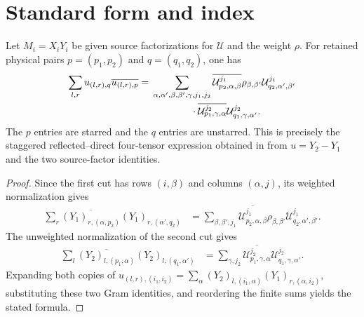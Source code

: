 \section{Standard form and index}

\begin{lemma}
    \label{thm:mpu_source_u_staggered_gram}
    \leanok
    Let $M_i=X_iY_i$ be given source factorizations for $\mathcal U$ and
    the weight $\rho$. For retained physical pairs $p=(p_1,p_2)$ and
    $q=(q_1,q_2)$, one has
    \begin{align}
        \sum_{l,r}u_{(l,r),q}\overline{u_{(l,r),p}}
        ={} & \sum_{\alpha,\alpha',\beta,\beta',\gamma,j_1,j_2}
        \overline{\mathcal U^{j_1}_{p_2,\alpha,\beta}}
        \rho_{\beta,\beta'}
        \mathcal U^{j_1}_{q_2,\alpha',\beta'} \notag            \\
            & \qquad\qquad\cdot
        \overline{\mathcal U^{j_2}_{p_1,\gamma,\alpha}}
        \mathcal U^{j_2}_{q_1,\gamma,\alpha'}.
    \end{align}
    The $p$ entries are starred and the $q$ entries are unstarred. This is
    precisely the staggered reflected--direct four-tensor expression obtained
    in \cite[equations~\texttt{X1X2b} and~\texttt{uUnitary}]{Cirac2017MPU} from $u=Y_2\mathbin{-}Y_1$ and the two source-factor
    identities.
\end{lemma}

\begin{proof}\leanok
    Since the first cut has rows $(i,\beta)$ and columns $(\alpha,j)$,
    its weighted normalization gives
    \begin{align}
        \sum_r\overline{(Y_1)_{r,(\alpha,p_2)}}
        (Y_1)_{r,(\alpha',q_2)}
         & =\sum_{\beta,\beta',j_1}
        \overline{\mathcal U^{j_1}_{p_2,\alpha,\beta}}
        \rho_{\beta,\beta'}
        \mathcal U^{j_1}_{q_2,\alpha',\beta'}.
    \end{align}
    The unweighted normalization of the second cut gives
    \begin{align}
        \sum_l\overline{(Y_2)_{l,(p_1,\alpha)}}
        (Y_2)_{l,(q_1,\alpha')}
         & =\sum_{\gamma,j_2}
        \overline{\mathcal U^{j_2}_{p_1,\gamma,\alpha}}
        \mathcal U^{j_2}_{q_1,\gamma,\alpha'}.
    \end{align}
    Expanding both copies of
    $u_{(l,r),(i_1,i_2)}=\sum_\alpha
        (Y_2)_{l,(i_1,\alpha)}(Y_1)_{r,(\alpha,i_2)}$, substituting these two
    Gram identities, and reordering the finite sums yields the stated formula.
\end{proof}

